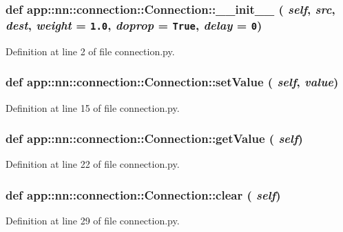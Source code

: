 \subsubsection{\setlength{\rightskip}{0pt plus 5cm}def app::nn::connection::Connection::\_\-\_\-init\_\-\_\- ( {\em self},  {\em src},  {\em dest},  {\em weight} = {\tt 1.0},  {\em doprop} = {\tt True},  {\em delay} = {\tt 0})}\label{classapp_1_1nn_1_1connection_1_1Connection_e4cda14434bab5f42d34529917e1587a}




Definition at line 2 of file connection.py.
\subsubsection{\setlength{\rightskip}{0pt plus 5cm}def app::nn::connection::Connection::setValue ( {\em self},  {\em value})}\label{classapp_1_1nn_1_1connection_1_1Connection_8e455ad0a874f8122ca5bafc853a400f}




Definition at line 15 of file connection.py.
\subsubsection{\setlength{\rightskip}{0pt plus 5cm}def app::nn::connection::Connection::getValue ( {\em self})}\label{classapp_1_1nn_1_1connection_1_1Connection_9a7d78cfa02260576ad06f433372060c}




Definition at line 22 of file connection.py.
\subsubsection{\setlength{\rightskip}{0pt plus 5cm}def app::nn::connection::Connection::clear ( {\em self})}\label{classapp_1_1nn_1_1connection_1_1Connection_15be4e7502f7a1b1a00c12eb9f875abc}




Definition at line 29 of file connection.py.
